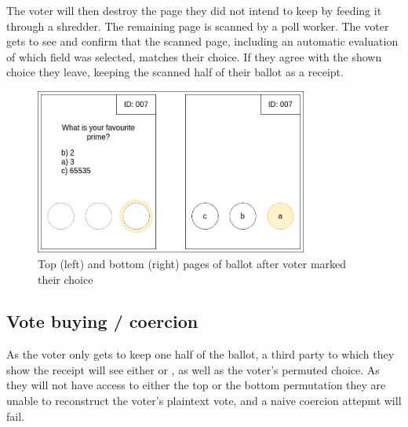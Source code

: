 The voter will then destroy the page they did not intend to keep by feeding it
through a shredder. The remaining page is scanned by a poll worker. The voter
gets to see and confirm that the scanned page, including an automatic
evaluation of which field was selected, matches their choice. If they agree
with the shown choice they leave, keeping the scanned half of their ballot as a
receipt.

\begin{figure}
\centering
\includegraphics[width=0.8\textwidth]{../resources/high_level_ballot_voted_split.drawio}
\caption{Top (left) and bottom (right) pages of ballot after voter marked their choice}
\label{fig:punchscan_ballot_voted}
\end{figure}

\subsection{Vote buying / coercion}

As the voter only gets to keep one half of the ballot, a third party to which
they show the receipt will see either \ptop{} or \pbottom{}, as well as the
voter's permuted choice. As they will not have access to either the top or the
bottom permutation they are unable to reconstruct the voter's plaintext vote,
and a naive coercion attepmt will fail.
